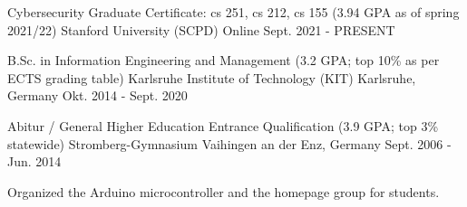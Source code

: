 

\begin{cventries}

  \cventry
    {Cybersecurity Graduate Certificate: cs 251, cs 212, cs 155 (3.94 GPA as of spring 2021/22)} %
    {Stanford University (SCPD)} %
    {Online} %
    {Sept. 2021 - PRESENT} %
    {}

  \cventry
    {B.Sc. in Information Engineering and Management (3.2 GPA; top 10\% as per ECTS grading table)} %
    {Karlsruhe Institute of Technology (KIT) } %
    {Karlsruhe, Germany} %
    {Okt. 2014 - Sept. 2020} %
    {}
  
  \cventry
    {Abitur / General Higher Education Entrance Qualification  (3.9 GPA; top 3\% statewide)} %
    {Stromberg-Gymnasium} %
    {Vaihingen an der Enz, Germany} %
    {Sept. 2006 - Jun. 2014} %
    {
      \begin{cvitems} %
        \item {Organized the Arduino microcontroller and the homepage group for students.}
      \end{cvitems}
    }

\end{cventries}
